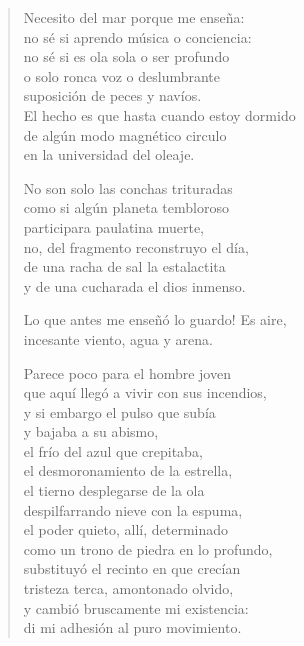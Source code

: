 \documentclass[12pt]{article}
\begin{document}
\clearpage
{}
\begin{verse}

Necesito del mar porque me enseña:\\
no sé si aprendo música o conciencia:\\
no sé si es ola sola o ser profundo\\
o solo ronca voz o deslumbrante\\
suposición de peces y navíos.\\
El hecho es que hasta cuando estoy dormido\\
de algún modo magnético circulo\\
en la universidad del oleaje.  

No son solo las conchas trituradas\\
como si algún planeta tembloroso\\
participara paulatina muerte,\\
no, del fragmento reconstruyo el día,\\
de una racha de sal la estalactita\\
y de una cucharada el dios inmenso.  

Lo que antes me enseñó lo guardo! Es aire,\\
incesante viento, agua y arena.  

Parece poco para el hombre joven\\
que aquí llegó a vivir con sus incendios,\\
y si embargo el pulso que subía\\
y bajaba a su abismo,\\
el frío del azul que crepitaba,\\
el desmoronamiento de la estrella,\\
el tierno desplegarse de la ola\\
despilfarrando nieve con la espuma,\\
el poder quieto, allí, determinado\\
como un trono de piedra en lo profundo,\\
substituyó el recinto en que crecían\\
tristeza terca, amontonado olvido,\\
y cambió bruscamente mi existencia:\\
di mi adhesión al puro movimiento.  

\end{verse}
\end{document}
